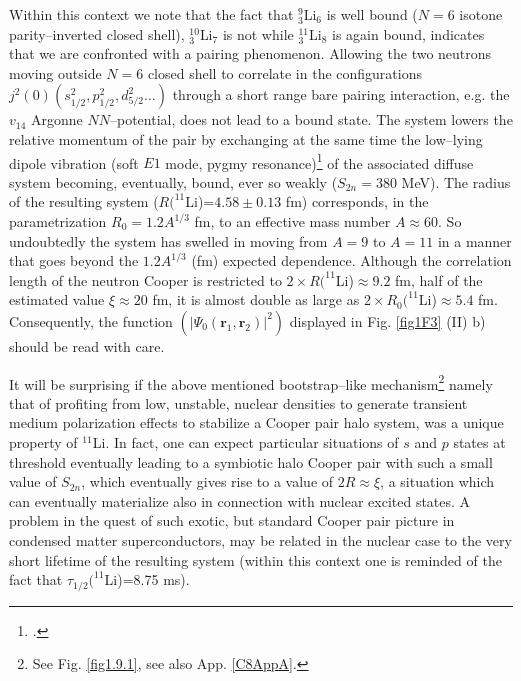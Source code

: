  Within this context we note that the fact that $^9_3$Li$_6$ is well bound ($N=6$ isotone parity--inverted closed shell), $^{10}_3$Li$_7$ is not while $^{11}_3$Li$_8$ is again bound, indicates that we are confronted with a pairing phenomenon. Allowing the two neutrons moving outside $N=6$ closed shell to correlate in the configurations $j^2(0) (s_{1/2}^2, p_{1/2}^2, d_{5/2}^2\dots)$ through a short range bare pairing interaction, e.g. the $v_{14}$ Argonne $NN$--potential, does not lead to a bound state. The system lowers the relative momentum of the pair by exchanging at the same time the low--lying dipole vibration (soft $E1$ mode, pygmy resonance)\footnote{\cite{Broglia:19}.} of the associated diffuse system becoming, eventually, bound, ever so weakly ($S_{2n}=380$ MeV). The radius of the resulting system ($R(^{11}$Li)=$4.58\pm 0.13$ fm) corresponds, in the parametrization $R_0=1.2 A^{1/3}$ fm, to an effective mass number $A\approx 60$. So undoubtedly the system has swelled in moving from $A=9$ to $A=11$ in a manner that goes beyond the $1.2A^{1/3}$ (fm) expected dependence. Although the correlation length of the neutron Cooper is restricted to $2\times R(^{11}$Li)$\approx 9.2$ fm, half of the estimated value $\xi\approx 20$ fm, it is almost double as large as $2\times R_0(^{11}$Li)$\approx 5.4$ fm. Consequently, the function $(|\Psi_0(\mathbf r_1,\mathbf r_2)|^2)$ displayed  in Fig. \ref{fig1F3} (II) b) should be read with care.

It will be surprising if the above mentioned  bootstrap--like mechanism\footnote{See Fig. \ref{fig1.9.1}, see also App. \ref{C8AppA}.}  namely that of profiting from  low, unstable, nuclear densities to generate transient medium polarization effects to stabilize a Cooper pair halo system, was a unique property of $^{11}$Li. In fact, one can expect particular situations of $s$ and $p$ states at threshold eventually leading to a symbiotic halo Cooper pair with such a small value of $S_{2n}$, which  eventually gives rise to a value of $2R\approx\xi$, a situation which can eventually materialize also in connection with  nuclear excited states. A problem in the quest of such exotic, but standard Cooper pair picture in condensed matter superconductors, may be related in the nuclear case to the very short lifetime of the resulting system (within this context one is reminded of the fact that $\tau_{1/2}(^{11}$Li)=8.75 ms).


